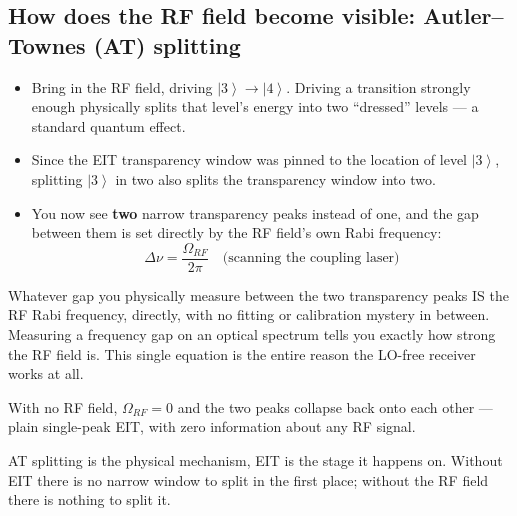\documentclass[11pt]{article}
\newcommand{\ket}[1]{\left|#1\right\rangle}
\begin{document}
\subsection*{How does the RF field become visible: Autler--Townes (AT) splitting}
\begin{itemize}
\item Bring in the RF field, driving $\ket{3}\to\ket{4}$. Driving a transition strongly enough physically splits that level's energy into two ``dressed'' levels --- a standard quantum effect.
\item Since the EIT transparency window was pinned to the location of level $\ket{3}$, splitting $\ket{3}$ in two also splits the transparency window into two.
\item You now see \textbf{two} narrow transparency peaks instead of one, and the gap between them is set directly by the RF field's own Rabi frequency:
\[
\Delta\nu = \frac{\Omega_{RF}}{2\pi}\quad\text{(scanning the coupling laser)}
\]
\end{itemize}
\begin{eqmeaning}
Whatever gap you physically measure between the two transparency peaks IS the RF Rabi frequency, directly, with no fitting or calibration mystery in between. Measuring a frequency gap on an optical spectrum tells you exactly how strong the RF field is. This single equation is the entire reason the LO-free receiver works at all.
\end{eqmeaning}
\begin{ifnot}
With no RF field, $\Omega_{RF}=0$ and the two peaks collapse back onto each other --- plain single-peak EIT, with zero information about any RF signal.
\end{ifnot}

\begin{center}
\end{center}

\begin{takeaway}
AT splitting is the physical mechanism, EIT is the stage it happens on. Without EIT there is no narrow window to split in the first place; without the RF field there is nothing to split it.
\end{takeaway}
\end{document}
